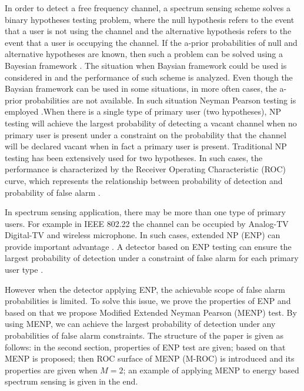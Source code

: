 \documentclass[12pt,journal,a4paper,twoside,onecolumn,draft]{IEEEtran}
\begin{document}
\begin{spacing}{2.5}
In order to detect a free frequency channel, a spectrum sensing scheme solves a binary hypotheses testing problem, where the null hypothesis refers to the event that a user is not using the channel and the alternative hypothesis refers to the event that a user is occupying the channel. If the a-prior probabilities of null and alternative hypotheses are known, then such a problem can be solved using a Bayesian framework \cite{poor1994introduction}. The situation when Baysian framework could be used is considered in \cite{zeng2010review} and the performance of such scheme is analyzed.
Even though the Baysian framework can be used in some situations, in more often cases, the a-prior probabilities are not available. In such situation Neyman Pearson testing is employed \cite{poor1994introduction}.When there is a single type of primary user (two hypotheses), NP testing will achieve the largest probability of detecting a vacant channel when no primary user is present under a constraint on the probability that the channel will be declared vacant when in fact a primary user is present.
Traditional NP testing has been extensively used for two hypotheses. In such cases,  the performance is characterized by the Receiver Operating Characteristic (ROC) curve, which represents the relationship between probability of detection and probability of false alarm \cite{poor1994introduction}.

In spectrum sensing application, there may be more than one type of primary users. For example in IEEE 802.22 \cite{shellhammer2008spectrum} the channel can be occupied by Analog-TV Digital-TV and wireless microphone. In such cases, extended NP (ENP) can provide important advantage \cite{zhang1999design}. A detector based on ENP testing can ensure the largest probability of detection under a constraint of false alarm for each primary user type \cite{LehmannTest}.

However when the detector applying ENP,  the achievable scope of false alarm probabilities is limited. To solve this issue, we prove the properties of ENP and based on that we propose Modified Extended Neyman Pearson (MENP) test. By using MENP, we can achieve the largest probability of detection under any probabilities of false alarm constraints.
The structure of the paper is given as follows: in the second section, properties of ENP test are given; based on that MENP is proposed; then ROC surface of MENP (M-ROC) is introduced and its properties are  given when $M = 2$; an example of applying MENP to energy based spectrum sensing is given in the end.


\end{spacing}
\end{document}
